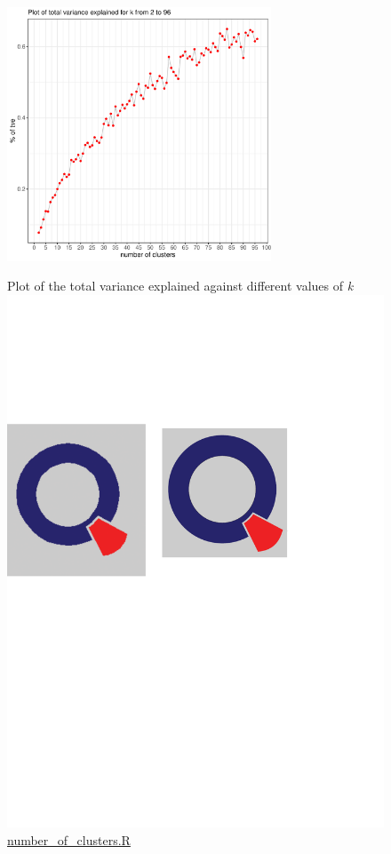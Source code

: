 \begin{figure}[H]
\begin{center}
\includegraphics[width=0.7\textwidth, keepaspectratio]{numclusters.pdf} \\
\caption{Plot of the total variance explained against different values of \textit{k} \protect\includegraphics[scale=0.05]{qletlogo.pdf} {\href{https://github.com/silvia-ventoruzzo/SPL-WISE-2018/blob/master/Helpers/number_of_clusters.R}{number\_of\_clusters.R}}}
\label{figure:numclusterplot}
\end{center}
\end{figure}

